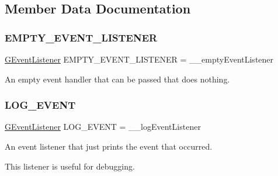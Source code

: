 \subsection{Member Data Documentation}
\mbox{\label{classsgl_1_1GEvent_ad4e5235f4489609eefdb603ed8d19c3d}} 
\subsubsection{\texorpdfstring{E\+M\+P\+T\+Y\+\_\+\+E\+V\+E\+N\+T\+\_\+\+L\+I\+S\+T\+E\+N\+ER}{EMPTY\_EVENT\_LISTENER}}
{\footnotesize\ttfamily \mbox{\hyperlink{namespacesgl_ae9f3e9eab70035da1a2b114e21357b25}{G\+Event\+Listener}} E\+M\+P\+T\+Y\+\_\+\+E\+V\+E\+N\+T\+\_\+\+L\+I\+S\+T\+E\+N\+ER = \+\_\+\+\_\+empty\+Event\+Listener\hspace{0.3cm}{\ttfamily [static]}}



An empty event handler that can be passed that does nothing. 

\mbox{\label{classsgl_1_1GEvent_ad9cb77a13a97c2de6a7f1bcb09f961ed}} 
\subsubsection{\texorpdfstring{L\+O\+G\+\_\+\+E\+V\+E\+NT}{LOG\_EVENT}}
{\footnotesize\ttfamily \mbox{\hyperlink{namespacesgl_ae9f3e9eab70035da1a2b114e21357b25}{G\+Event\+Listener}} L\+O\+G\+\_\+\+E\+V\+E\+NT = \+\_\+\+\_\+log\+Event\+Listener\hspace{0.3cm}{\ttfamily [static]}}



An event listener that just prints the event that occurred. 

This listener is useful for debugging. 